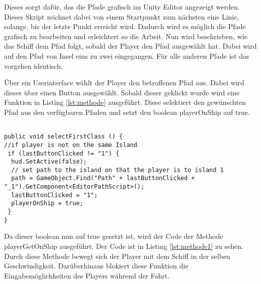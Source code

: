 Dieses sorgt dafür, das die Pfade grafisch im Unity Editor angezeigt werden. Dieses Skript zeichnet dabei von einem Startpunkt zum nächsten eine Linie, solange, bis der letzte Punkt erreicht wird. Dadurch wird es möglich die Pfade grafisch zu bearbeiten und erleichtert so die Arbeit. 
Nun wird beschrieben, wie das Schiff dem Pfad folgt, sobald der Player den Pfad ausgewählt hat. Dabei wird auf den Pfad von Insel eins zu zwei eingegangen. Für alle anderen Pfade ist das vorgehen identisch.

Über ein Userinterface wählt der Player den betroffenen Pfad aus. Dabei wird dieser über einen Button ausgewählt. Sobald dieser geklickt wurde wird eine Funktion in Listing \ref{lst:methode} ausgeführt. Diese selektiert den gewünschten Pfad aus den verfügbaren Pfaden und setzt den boolean playerOnShip auf true. 

\begin{scriptsize}
\lstset{
	float,
	caption=Methode selectFirstClass, 
	language=[Sharp]C, 
	frame=single,  
	showstringspaces=false, 
	showspaces=false, 
	numbers=left, 
	captionpos=b, 
	belowcaptionskip=4pt,
	basicstyle=\ttfamily
} 
\begin{lstlisting}[label=lst:methode]

public void selectFirstClass () {
//if player is not on the same Island
 if (lastButtonClicked != "1") {
  hud.SetActive(false);
  // set path to the island on that the player is to island 1
  path = GameObject.Find("Path" + lastButtonClicked + "_1").GetComponent<EditorPathScript>();
  lastButtonClicked = "1";
  playerOnShip = true;
 }
}

\end{lstlisting}
\end{scriptsize}

Da dieser boolean nun auf true gesetzt ist, wird der Code der Methode playerGetOnShip ausgeführt. Der Code ist in Listing \ref{lst:methode1} zu sehen. Durch diese Methode bewegt sich der Player mit dem Schiff in der selben Geschwindigkeit. Darüberhinaus blokiert diese Funktion die Eingabemöglichkeiten des Players während der Fahrt.

